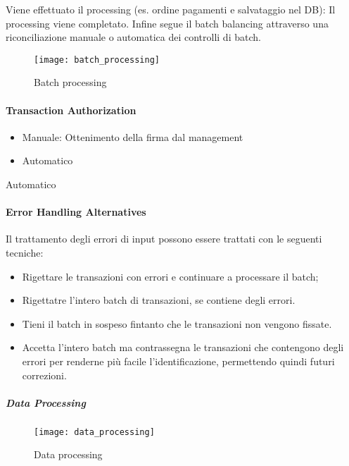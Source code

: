 Viene effettuato il processing (es. ordine pagamenti e salvataggio nel DB):
Il processing viene completato.
Infine segue il batch balancing attraverso 
una riconciliazione manuale o automatica dei controlli di batch.

\begin{figure}[h!]
        \begin{center}
                \texttt{[image: batch\_processing]}
        \end{center}
        \caption{Batch processing}
        \label{fig:security:batch:processing}
\end{figure}

\paragraph{Transaction Authorization}
\begin{itemize}
	\item Manuale: Ottenimento della firma dal management 
	\item Automatico
\end{itemize}

Automatico

\paragraph{Error Handling Alternatives}
Il trattamento degli errori di input possono essere trattati
con le seguenti tecniche:
\begin{itemize}
\item Rigettare le transazioni con errori e continuare a processare 
il batch;
\item Rigettatre l'intero batch di transazioni, se contiene
degli errori.
\item Tieni il batch in sospeso fintanto che le transazioni 
non vengono fissate.
\item Accetta l'intero batch ma contrassegna le transazioni che
contengono degli errori per renderne più facile l'identificazione,
permettendo quindi futuri correzioni.
\end{itemize}


\subparagraph{Data Processing}

\begin{figure}[h!]
        \begin{center}
                \texttt{[image: data\_processing]}
        \end{center}
        \caption{Data processing}
        \label{fig:data:processing}
\end{figure}

